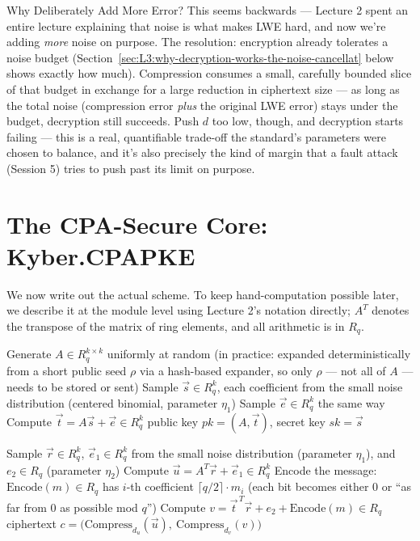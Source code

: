 \begin{rmkbox}{Why Deliberately Add More Error?}
This seems backwards --- Lecture 2 spent an entire lecture explaining that noise is what makes LWE hard, and now we're adding \emph{more} noise on purpose. The resolution: encryption already tolerates a noise budget (Section~\ref{sec:L3:why-decryption-works-the-noise-cancellat} below shows exactly how much). Compression consumes a small, carefully bounded slice of that budget in exchange for a large reduction in ciphertext size --- as long as the total noise (compression error \emph{plus} the original LWE error) stays under the budget, decryption still succeeds. Push $d$ too low, though, and decryption starts failing --- this is a real, quantifiable trade-off the standard's parameters were chosen to balance, and it's also precisely the kind of margin that a fault attack (Session 5) tries to push past its limit on purpose.
\end{rmkbox}

\section{The CPA-Secure Core: Kyber.CPAPKE}
\label{sec:L3:the-cpa-secure-core-kyber-cpapke}

We now write out the actual scheme. To keep hand-computation possible later, we describe it at the module level using Lecture 2's notation directly; $A^T$ denotes the transpose of the matrix of ring elements, and all arithmetic is in $R_q$.

\begin{algorithm}[h]
\caption{Kyber.CPAPKE.KeyGen}
\begin{algorithmic}[1]
\State Generate $A \in R_q^{k\times k}$ uniformly at random (in practice: expanded deterministically from a short public seed $\rho$ via a hash-based expander, so only $\rho$ --- not all of $A$ --- needs to be stored or sent)
\State Sample $\vec s \in R_q^k$, each coefficient from the small noise distribution (centered binomial, parameter $\eta_1$)
\State Sample $\vec e \in R_q^k$ the same way
\State Compute $\vec t = A\vec s + \vec e \in R_q^k$
\State \Return public key $pk = (A, \vec t)$, secret key $sk = \vec s$
\end{algorithmic}
\end{algorithm}

\begin{algorithm}[h]
\caption{Kyber.CPAPKE.Enc$(pk = (A,\vec t),\ m \in \{0,1\}^n)$}
\begin{algorithmic}[1]
\State Sample $\vec r \in R_q^k$, $\vec e_1 \in R_q^k$ from the small noise distribution (parameter $\eta_1$), and $e_2 \in R_q$ (parameter $\eta_2$)
\State Compute $\vec u = A^T \vec r + \vec e_1 \in R_q^k$
\State Encode the message: $\mathrm{Encode}(m) \in R_q$ has $i$-th coefficient $\lceil q/2\rceil \cdot m_i$ (each bit becomes either $0$ or ``as far from $0$ as possible mod $q$'')
\State Compute $v = \vec t^{\,T}\vec r + e_2 + \mathrm{Encode}(m) \in R_q$
\State \Return ciphertext $c = \big(\mathrm{Compress}_{d_u}(\vec u),\ \mathrm{Compress}_{d_v}(v)\big)$
\end{algorithmic}
\end{algorithm}


